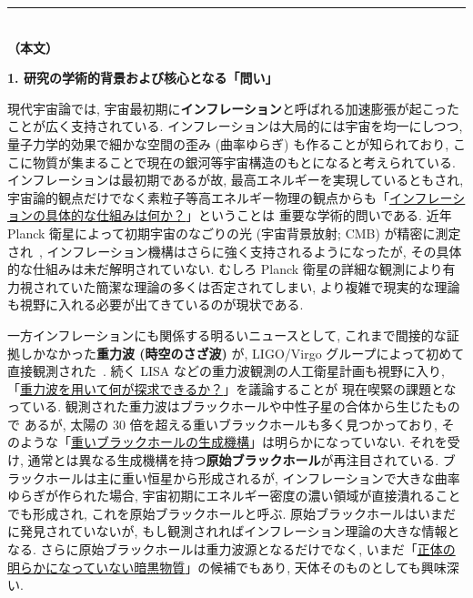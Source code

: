 \documentclass[11pt,a4paper,uplatex,dvipdfmx]{ujarticle} 		%
\newcommand{\研究課題名}{確率解析・原始ブラックホール・重力波観測から迫るインフレーション}
\newcommand{\研究機関名}{名古屋大学}
\newcommand{\研究代表者氏名}{多田祐一郎}
\newcommand{\研究期間の最終元号年度}{6}  %
\renewcommand{\emph}[1]{{\sffamily\gtfamily\bfseries #1}}
\begin{document}
\noindent
\rule{\linewidth}{1pt}\\
\noindent
\textbf{（本文）}

\begin{mdframed}[roundcorner=0.5zw,
	innertopmargin=0.8zw,innerbottommargin=0.8zw,
	linecolor=black!50,linewidth=0.2zw,
	backgroundcolor=black!10]
	{\bfseries\gtfamily\sffamily\large 1. 研究の学術的背景および核心となる「問い」}
\end{mdframed}

\noindent
現代宇宙論では, 宇宙最初期に\emph{インフレーション}と呼ばれる加速膨張が起こったことが広く支持されている.
インフレーションは大局的には宇宙を均一にしつつ, 量子力学的効果で細かな空間の歪み (曲率ゆらぎ) も作ることが知られており, 
ここに物質が集まることで現在の銀河等宇宙構造のもとになると考えられている.
インフレーションは最初期であるが故, 最高エネルギーを実現しているともされ,
宇宙論的観点だけでなく素粒子等高エネルギー物理の観点からも「\ul{インフレーションの具体的な仕組みは何か？}」ということは
重要な学術的問いである.
近年 Planck 衛星によって初期宇宙のなごりの光 (宇宙背景放射; CMB) が精密に測定され~\cite{Planck:2013jfk},
インフレーション機構はさらに強く支持されるようになったが, その具体的な仕組みは未だ解明されていない.
むしろ Planck 衛星の詳細な観測により有力視されていた簡潔な理論の多くは否定されてしまい, 
より複雑で現実的な理論も視野に入れる必要が出てきているのが現状である.

一方インフレーションにも関係する明るいニュースとして, これまで間接的な証拠しかなかった\emph{重力波 (時空のさざ波)} が, 
LIGO/Virgo グループによって初めて直接観測された~\cite{Abbott:2016blz}. 
続く LISA などの重力波観測の人工衛星計画も視野に入り, 「\ul{重力波を用いて何が探求できるか？}」を議論することが
現在喫緊の課題となっている.
観測された重力波はブラックホールや中性子星の合体から生じたもので あるが, 
太陽の 30 倍を超える重いブラックホールも多く見つかっており, そのような「\ul{重いブラックホールの生成機構}」は明らかになっていない.
それを受け, 通常とは異なる生成機構を持つ\emph{原始ブラックホール}が再注目されている. 
ブラックホールは主に重い恒星から形成されるが, インフレーションで大きな曲率ゆらぎが作られた場合, 
宇宙初期にエネルギー密度の濃い領域が直接潰れることでも形成され, これを原始ブラックホールと呼ぶ. 
原始ブラックホールはいまだに発見されていないが, もし観測されればインフレーション理論の大きな情報となる. 
さらに原始ブラックホールは重力波源となるだけでなく, いまだ「\ul{正体の明らかになっていない暗黒物質}」の候補でもあり, 天体そのものとしても興味深い.
\end{document}
